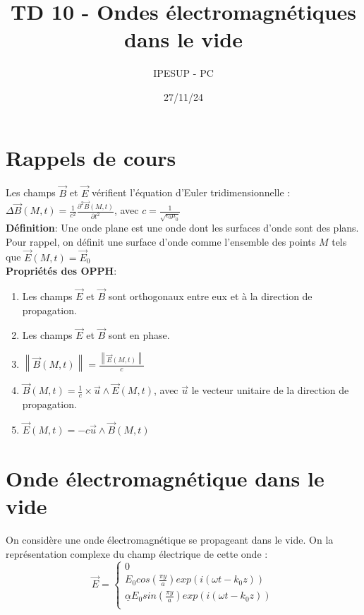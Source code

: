 \documentclass{article}
\title{TD 10 - Ondes électromagnétiques dans le vide}
\author{IPESUP - PC }
\date{27/11/24}
\begin{document}
\maketitle

\section{Rappels de cours}

Les champs $\vec{B}$ et $\vec{E}$ vérifient l'équation d'Euler tridimensionnelle : \\

$\Delta \vec{B}(M, t) = \frac{1}{c^2} \frac{\partial^2 \vec{B}(M, t)}{\partial t^2}$, avec $c=\frac{1}{\sqrt{\epsilon_0 \mu_0}}$ \\

\textbf{Définition}: Une onde plane est une onde dont les surfaces d'onde sont des plans. Pour rappel, on définit une surface d'onde comme l'ensemble des points $M$ tels que $\vec{E}(M, t) = \vec{E}_0$  \\

\textbf{Propriétés des OPPH}: \\
\begin{enumerate}
  \item Les champs $\vec{E}$ et $\vec{B}$ sont orthogonaux entre eux et à la direction de propagation.
  \item Les champs $\vec{E}$ et $\vec{B}$ sont en phase.
  \item $\left\lVert \vec{B}(M, t) \right\rVert  = \frac{\left\lVert \vec{E}(M, t) \right\rVert}{c}$
  \item $\vec{B}(M, t) = \frac{1}{c} \times \vec{u} \wedge \vec{E}(M, t)$, avec $\vec{u}$ le vecteur unitaire de la direction de propagation.
  \item $\vec{E}(M, t) = -c \vec{u} \wedge \vec{B}(M, t)$
\end{enumerate}


\section{Onde électromagnétique dans le vide}

On considère une onde électromagnétique se propageant dans le vide. On la représentation complexe du champ électrique de cette onde : \\



\[
\vec{E} = \left\{
\begin{array}{l}
0 \\
E_0 cos(\frac{\pi y }{a}) exp(i(\omega t - k_0 z)) \\
\underline{\alpha} E_0 sin (\frac{\pi y}{a}) exp(i(\omega t - k_0 z)) \\
\end{array}
\right.
\]
\end{document}

